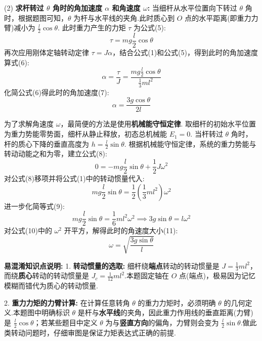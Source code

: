 (2) \textbf{求杆转过 $\theta$ 角时的角加速度 $\alpha$ 和角速度 $\omega$:}
当细杆从水平位置向下转过 $\theta$ 角时，根据题图可知，$\theta$ 为杆与水平线的夹角.此时质心到 $O$ 点的水平距离(即重力力臂)减小为 $\frac{l}{2} \cos\theta$.
此时重力产生的力矩 $\tau$ 为公式(5):
\begin{equation}
	\tau = mg \frac{l}{2} \cos\theta
\end{equation}
再次应用刚体定轴转动定律 $\tau = J\alpha$，结合公式(1)和公式(5)，得到此时的角加速度算式(6):
\begin{equation}
	\alpha = \frac{\tau}{J} = \frac{mg \frac{l}{2} \cos\theta}{\frac{1}{3}ml^2}
\end{equation}
化简公式(6)得此时的角加速度(7):
\begin{equation}
	\alpha = \frac{3g \cos\theta}{2l}
\end{equation}

为了求解角速度 $\omega$，最简便的方法是使用\textbf{机械能守恒定律}.
取细杆的初始水平位置为重力势能零势面，细杆从静止释放，初态总机械能 $E_1 = 0$.
当杆转过 $\theta$ 角时，杆的质心下降的垂直高度为 $h = \frac{l}{2} \sin\theta$.
根据机械能守恒定律，系统的重力势能与转动动能之和为零，建立公式(8):
\begin{equation}
	0 = -mg \frac{l}{2} \sin\theta + \frac{1}{2}J\omega^2 
\end{equation}
对公式(8)移项并将公式(1)中的转动惯量代入:
\begin{equation}
	mg \frac{l}{2} \sin\theta = \frac{1}{2} \left(\frac{1}{3}ml^2\right) \omega^2
\end{equation}
进一步化简等式(9):
\begin{equation}
	mg \frac{l}{2} \sin\theta = \frac{1}{6} ml^2 \omega^2 \implies 3g \sin\theta = l\omega^2
\end{equation}
对公式(10)中的 $\omega^2$ 开平方，解得此时的角速度大小(11):
\begin{equation}
	\omega = \sqrt{\frac{3g \sin\theta}{l}}
\end{equation}

\vspace{1em}

\textbf{易混淆知识点说明:}
1. \textbf{转动惯量的选取:} 细杆绕\textbf{端点}转动的转动惯量是 $J = \frac{1}{3}ml^2$，而绕\textbf{质心}转动的转动惯量是 $J_c = \frac{1}{12}ml^2$.本题固定轴在 $O$ 点(端点)，极易因为记忆模糊而错代为质心的转动惯量.

2. \textbf{重力力矩的力臂计算:} 在计算任意转角 $\theta$ 的重力力矩时，必须明确 $\theta$ 的几何定义.本题图中明确标识 $\theta$ 是杆与\textbf{水平线}的夹角，因此重力作用线的垂直距离(力臂)是 $\frac{l}{2}\cos\theta$；若某些题目中定义 $\theta$ 为与\textbf{竖直方向}的偏角，力臂则会变为 $\frac{l}{2}\sin\theta$.做此类转动问题时，仔细审图是保证力矩表达式正确的前提.

